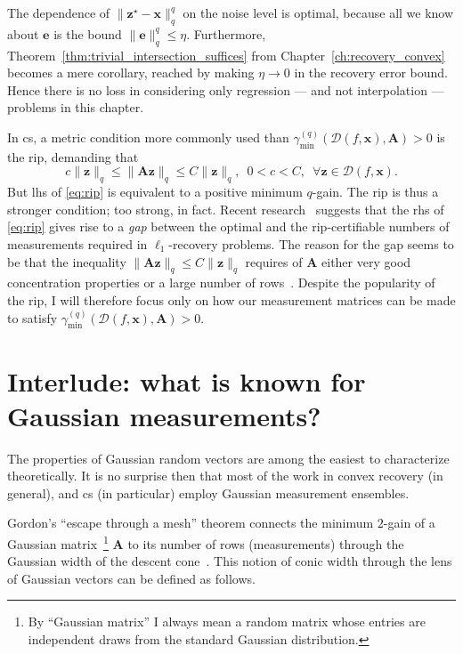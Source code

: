 The dependence of $\|\mathbf{z}^\star - \mathbf{x}\|_q^q$ on the noise level is optimal, because all we know about $\mathbf{e}$ is the bound $\|\mathbf{e}\|_q^{q} \leq \eta$. Furthermore, Theorem~\ref{thm:trivial_intersection_suffices} from Chapter~\ref{ch:recovery_convex} becomes a mere corollary, reached by making $\eta \to 0$ in the recovery error bound. Hence there is no loss in considering only regression --- and not interpolation --- problems in this chapter.

In \acrlong{cs}, a metric condition more commonly used than $\gamma_{\min}^{(q)} \left ( \mathcal{D}( f, \mathbf{x}), \mathbf{A} \right ) > 0$ is the \acrfull{rip}, demanding that
\begin{equation}
    c \|\mathbf{z}\|_q \leq \|\mathbf{Az}\|_q \leq C\|\mathbf{z}\|_q, \enspace 0< c < C, \enspace \forall \mathbf{z} \in \mathcal{D}( f, \mathbf{x}).
    \label{eq:rip}
\end{equation}
But \acrlong{lhs} of \eqref{eq:rip} is equivalent to a positive minimum $q$-gain. The \acrshort{rip} is thus a stronger condition; too strong, in fact. Recent research~\cite{dirksen2018a} suggests that the \acrlong{rhs} of \eqref{eq:rip} gives rise to a \emph{gap} between the optimal and the \acrshort{rip}-certifiable numbers of measurements required in $\ell_1$-recovery problems. The reason for the gap seems to be that the inequality $\|\mathbf{Az}\|_q \leq C\|\mathbf{z}\|_q$ requires of $\mathbf{A}$ either very good concentration properties or a large number of rows~\cite{lecue2017}. Despite the popularity of the \acrshort{rip}, I will therefore focus only on how our measurement matrices can be made to satisfy $\gamma_{\min}^{(q)} \left ( \mathcal{D}( f, \mathbf{x}), \mathbf{A} \right ) > 0$.


\section{Interlude: what is known for Gaussian measurements?}

The properties of Gaussian random vectors are among the easiest to characterize theoretically. It is no surprise then that most of the work in convex recovery \cite{chandrasekaran2012, tropp2015a, vershynin2015a, plan2016, liaw2017, plan2017, vershynin2017} (in general), and \acrlong{cs} \cite{foucart2013, foygel2014, dirksen2018, dirksen2018a} (in particular) employ Gaussian measurement ensembles.

Gordon's ``escape through a mesh'' theorem \cite[Cor. 1.2]{gordon1988} connects the minimum $2$-gain of a Gaussian matrix~\footnote{By ``Gaussian matrix'' I always mean a random matrix whose entries are independent draws from the standard Gaussian distribution.} $\mathbf{A}$ to its number of rows (measurements) through the Gaussian width of the descent cone~\cite[Cor. 3.3]{chandrasekaran2012}. This notion of conic width through the lens of Gaussian vectors can be defined as follows.


